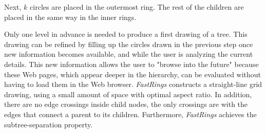 \documentclass[]{article}
\begin{document}
{%


Next, $k$ circles are placed in the outermost ring.  The rest of the children are placed in the same way in the inner rings.

Only one level in advance is needed to produce a first drawing of a tree.  
This drawing can be refined by filling up the circles drawn in the previous step once new information becomes available, and while the user is analyzing the current details.
This new information allows the user to "browse into the future" because these Web pages, which appear deeper in the hierarchy, can be evaluated without having to load them in the Web browser.
{\em FastRings} constructs a straight-line grid drawing, using a small amount of space with optimal aspect ratio.
In addition, there are no edge crossings inside child nodes, the only crossings are with the edges that connect a parent to its children.
Furthermore, {\em FastRings} achieves the subtree-separation property.

}
\end{document}
